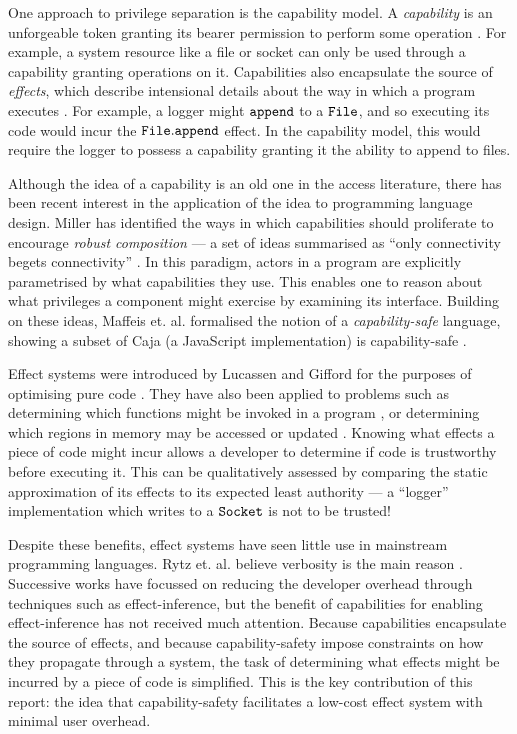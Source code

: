 One approach to privilege separation is the capability model. A \textit{capability} is an unforgeable token granting its bearer permission to perform some operation \cite{dennis66}. For example, a system resource like a file or socket can only be used through a capability granting operations on it. Capabilities also encapsulate the source of \textit{effects}, which describe intensional details about the way in which a program executes \cite{nielson99}. For example, a logger might $\mathtt{append}$ to a $\mathtt{File}$, and so executing its code would incur the $\mathtt{File.append}$ effect. In the capability model, this would require the logger to possess a capability granting it the ability to append to files.

Although the idea of a capability is an old one in the access literature, there has been recent interest in the application of the idea to programming language design. Miller has identified the ways in which capabilities should proliferate to encourage \textit{robust composition} --- a set of ideas summarised as ``only connectivity begets connectivity'' \cite{miller06}. In this paradigm, actors in a program are explicitly parametrised by what capabilities they use. This enables one to reason about what privileges a component might exercise by examining its interface. Building on these ideas, Maffeis et. al. formalised the notion of a \textit{capability-safe} language, showing a subset of Caja (a JavaScript implementation) is capability-safe \cite{maffeis10}.

Effect systems were introduced by Lucassen and Gifford for the purposes of optimising pure code \cite{lucassen88}. They have also been applied to problems such as determining which functions might be invoked in a program \cite{tang94}, or determining which regions in memory may be accessed or updated \cite{talpin94}. Knowing what effects a piece of code might incur allows a developer to determine if code is trustworthy before executing it. This can be qualitatively assessed by comparing the static approximation of its effects to its expected least authority --- a ``logger'' implementation which writes to a $\mathtt{Socket}$ is not to be trusted!

Despite these benefits, effect systems have seen little use in mainstream programming languages. Rytz et. al. believe verbosity is the main reason \cite{rytz2012}. Successive works have focussed on reducing the developer overhead through techniques such as effect-inference, but the benefit of capabilities for enabling effect-inference has not received much attention. Because capabilities encapsulate the source of effects, and because capability-safety impose constraints on how they propagate through a system, the task of determining what effects might be incurred by a piece of code is simplified. This is the key contribution of this report: the idea that capability-safety facilitates a low-cost effect system with minimal user overhead. 

